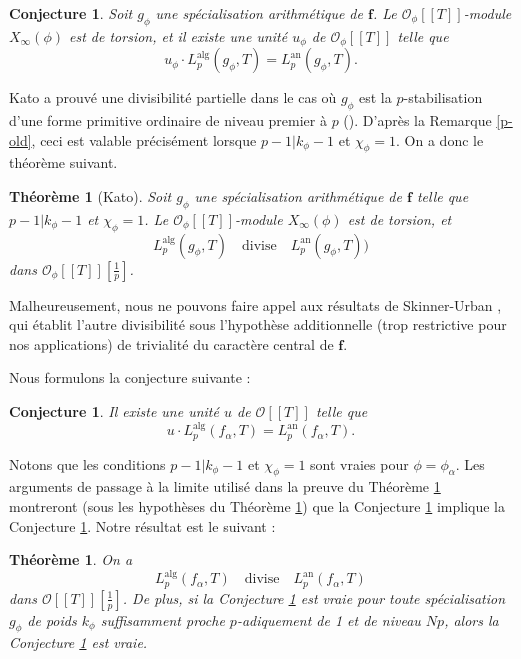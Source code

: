 \documentclass[12pt]{amsart}
\newcommand\cO{\mathcal{O}}
\newcommand{\an}{\textrm{an}}
\newcommand{\alg}{\textrm{alg}}
\theoremstyle{defstyle}
\theoremstyle{thmstyle}
\newtheorem{theorem}[subsubsection]{Théorème}
\newtheorem{conjecture}[subsubsection]{Conjecture}
\begin{document}
\begin{conjecture}\label{IMCg}
	Soit $g_\phi$ une spécialisation arithmétique de $\textbf{f}$. Le $\cO_\phi[[T]]$-module $X_\infty(\phi)$ est de torsion, et il existe une unité $u_\phi$ de $\cO_\phi[[T]]$ telle que
	$$ u_\phi \cdot L_p^{\alg}(g_\phi,T)=L^\an_p(g_\phi,T).$$
\end{conjecture}

Kato a prouvé une divisibilité partielle dans le cas où $g_\phi$ est la $p$-stabilisation d'une forme primitive ordinaire de niveau premier à $p$ (\cite[Theorem 17.4]{kato2004p}). D'après la Remarque \ref{p-old}, ceci est valable précisément lorsque $p-1|k_\phi-1$ et $\chi_\phi=1$. On a donc le théorème suivant.

\begin{theorem}[Kato]\label{Katotors}
	Soit $g_\phi$ une spécialisation arithmétique de $\textbf{f}$ telle que $p-1|k_\phi-1$ et $\chi_\phi=1$. Le $\cO_\phi[[T]]$-module $X_\infty(\phi)$ est de torsion, et 
	$$ L_p^{\alg}(g_\phi,T) \quad \textrm{divise} \quad L^\an_p(g_\phi,T))$$
	dans $\cO_\phi[[T]][\tfrac{1}{p}]$.
\end{theorem}

Malheureusement, nous ne pouvons faire appel aux résultats de Skinner-Urban \cite[Theorem 3.29]{skinner2014iwasawa}, qui établit l'autre divisibilité sous l'hypothèse additionnelle (trop restrictive pour nos applications) de trivialité du caractère central de $\textbf{f}$. 

Nous formulons la conjecture suivante :

\begin{conjecture}\label{IMC_f_alpha}
	Il existe une unité $u$ de $\cO[[T]]$ telle que 
	$$ u \cdot L_p^{\alg}(f_\alpha,T)=L^\an_p(f_\alpha,T).$$
\end{conjecture}

Notons que les conditions $p-1|k_\phi -1$ et $\chi_\phi=1$ sont vraies pour $\phi=\phi_\alpha$. Les arguments de passage à la limite utilisé dans la preuve du Théorème \ref{ThC} montreront (sous les hypothèses du Théorème \ref{ThC}) que la Conjecture \ref{IMCg} implique la Conjecture \ref{IMC_f_alpha}. Notre résultat est le suivant :

\begin{theorem}\label{ThC}
	On a $$ L_p^{\alg}(f_\alpha,T)\quad \textrm{divise}\quad L^\an_p(f_\alpha,T) $$
	dans $\cO[[T]][\tfrac{1}{p}]$. De plus, si la Conjecture \ref{IMCg} est vraie pour toute spécialisation $g_\phi$ de poids $k_\phi$ suffisamment proche $p$-adiquement de 1 et de niveau $Np$, alors la Conjecture \ref{IMC_f_alpha} est vraie.
\end{theorem}
\end{document}
